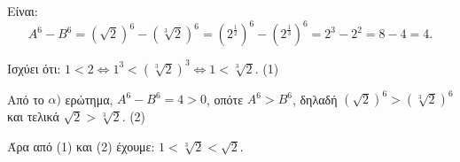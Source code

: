 
\begin{alist}
\item Είναι:
\[A^6 - B^6 = \left( \sqrt{2} \right)^6 - \left( \sqrt[3]{2} \right)^6 = \left(2^{\frac{1}{2}}\right)^6 - \left(2^{\frac{1}{3}}\right)^6 = 2^3 - 2^2 = 8 - 4 = 4.\]

\item Ισχύει ότι:
$1 < 2 \Leftrightarrow 1^3 < (\sqrt[3]{2})^3 \Leftrightarrow 1 < \sqrt[3]{2}$. (1)

Από το $\alpha)$ ερώτημα, $A^6 - B^6 = 4 > 0$, οπότε $A^6 > B^6$, δηλαδή
$(\sqrt{2})^6 > (\sqrt[3]{2})^6$ και τελικά $\sqrt{2} > \sqrt[3]{2}$. (2)

Άρα από (1) και (2) έχουμε: $1 < \sqrt[3]{2} < \sqrt{2}$.
\end{alist}

